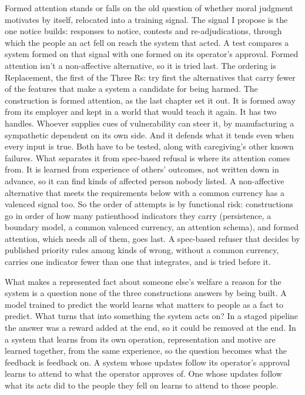 Formed attention stands or falls on the old question of whether moral judgment motivates by itself, relocated into a training signal. The signal I propose is the one notice builds: responses to notice, contests and re-adjudications, through which the people an act fell on reach the system that acted. A test compares a system formed on that signal with one formed on its operator's approval. Formed attention isn't a non-affective alternative, so it is tried last. The ordering is Replacement, the first of the Three Rs: try first the alternatives that carry fewer of the features that make a system a candidate for being harmed. The construction is formed attention, as the last chapter set it out. It is formed away from its employer and kept in a world that would teach it again. It has two handles. Whoever supplies cues of vulnerability can steer it, by manufacturing a sympathetic dependent on its own side. And it defends what it tends even when every input is true. Both have to be tested, along with caregiving's other known failures. What separates it from spec-based refusal is where its attention comes from. It is learned from experience of others' outcomes, not written down in advance, so it can find kinds of affected person nobody listed. A non-affective alternative that meets the requirements below with a common currency has a valenced signal too. So the order of attempts is by functional risk: constructions go in order of how many patienthood indicators they carry (persistence, a boundary model, a common valenced currency, an attention schema), and formed attention, which needs all of them, goes last. A spec-based refuser that decides by published priority rules among kinds of wrong, without a common currency, carries one indicator fewer than one that integrates, and is tried before it.

What makes a represented fact about someone else's welfare a reason for the system is a question none of the three constructions answers by being built. A model trained to predict the world learns what matters to people as a fact to predict. What turns that into something the system acts on? In a staged pipeline the answer was a reward added at the end, so it could be removed at the end. In a system that learns from its own operation, representation and motive are learned together, from the same experience, so the question becomes what the feedback is feedback on. A system whose updates follow its operator's approval learns to attend to what the operator approves of. One whose updates follow what its acts did to the people they fell on learns to attend to those people.

